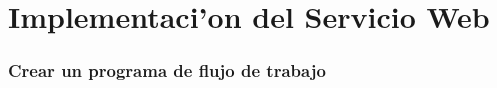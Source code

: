 \chapter{Implementaci'on del Servicio Web}
\label{capitulosiete}


\subsection{Crear un programa de flujo de trabajo}










